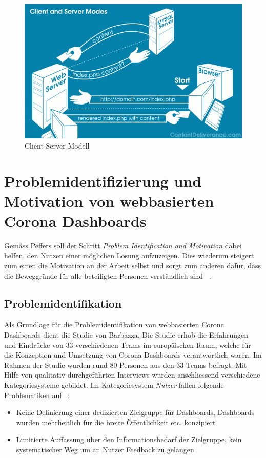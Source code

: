 \documentclass[12pt, oneside]{article}
\begin{document}
\begin{figure}[ht]
	\includegraphics[width=12cm]{images/client_server_model.png}
	\centering
	\caption{Client-Server-Modell ~\citep{client_server_model}}
\end{figure}

\clearpage
\section{Problemidentifizierung und Motivation von webbasierten Corona Dashboards}
Gemäss Peffers soll der Schritt \textit{Problem Identification and Motivation} dabei helfen, den Nutzen einer möglichen Lösung aufzuzeigen. Dies wiederum steigert zum einen die Motivation an der Arbeit selbst und sorgt zum anderen dafür, dass die Beweggründe für alle beteiligten Personen verständlich sind ~\citep[S. 52 + 55]{K.Peffers.2007}.


\subsection{Problemidentifikation}
Als Grundlage für die Problemidentifikation von webbasierten Corona Dashboards dient die Studie von Barbazza. Die Studie erhob die Erfahrungen und Eindrücke von 33 verschiedenen Teams im europäischen Raum, welche für die Konzeption und Umsetzung von Corona Dashboards verantwortlich waren. Im Rahmen der Studie wurden rund 80 Personen aus den 33 Teams befragt. Mit Hilfe von qualitativ durchgeführten Interviews wurden anschliessend verschiedene Kategoriesysteme gebildet. Im Kategoriesystem \textit{Nutzer} fallen folgende Problematiken auf ~\citep[S. 14 + 15]{Barbazza.}:
\begin{itemize}
    \item Keine Definierung einer dedizierten Zielgruppe für Dashboards, Dashboards wurden mehrheitlich für die breite Öffentlichkeit etc. konzipiert
    \item Limitierte Auffassung über den Informationsbedarf der Zielgruppe, kein systematischer Weg um an Nutzer Feedback zu gelangen
\end{itemize}
\end{document}

